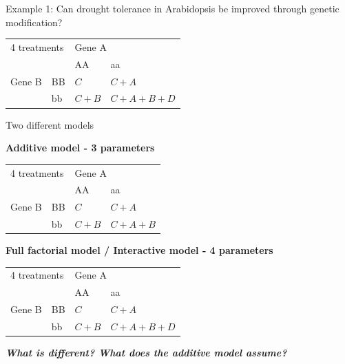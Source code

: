 \documentclass[10pt]{beamer}
\begin{document}
\begin{frame}{Example 1: Can drought tolerance in Arabidopsis be improved through genetic modification?}
\pause

\begin{center}
\begin{tabular}{|l | l | l | l | }
\toprule
  \multicolumn{2}{|l|}{4 treatments} & \multicolumn{2}{l|}{Gene A}\\
  \cmidrule(lr){3-4}
  \multicolumn{2}{|l|}{}  & AA & aa\\
 	    \midrule
      Gene B & BB & $C$ & $C+A$\\
      \cmidrule(lr){3-4}
 	    & bb & $C+B$ & $C+A+B+D$\\
	    \bottomrule
  \end{tabular}
\end{center}
 
\end{frame}

\begin{frame}{Two different models}

\textbf{Additive model - 3 parameters}
\begin{center}
\begin{tabular}{|l | l | l | l | }
\toprule
  \multicolumn{2}{|l|}{4 treatments} & \multicolumn{2}{l|}{Gene A}\\
  \cmidrule(lr){3-4}
  \multicolumn{2}{|l|}{}  & AA & aa\\
 	    \midrule
      Gene B & BB & $C$ & $C+A$\\
      \cmidrule(lr){3-4}
 	    & bb & $C+B$ & $C+A+B$\\
	    \bottomrule
  \end{tabular}
\end{center}
 

\textbf{Full factorial model / Interactive model  - 4 parameters }
\begin{center}
\begin{tabular}{|l | l | l | l | }
\toprule
  \multicolumn{2}{|l|}{4 treatments} & \multicolumn{2}{l|}{Gene A}\\
  \cmidrule(lr){3-4}
  \multicolumn{2}{|l|}{}  & AA & aa\\
 	    \midrule
      Gene B & BB & $C$ & $C+A$\\
      \cmidrule(lr){3-4}
 	    & bb & $C+B$ & $C+A+B+D$\\
	    \bottomrule
  \end{tabular}
\end{center}
 

 \textbf{\emph{What is different? What does the additive model assume?}}
\end{frame}
\end{document}
